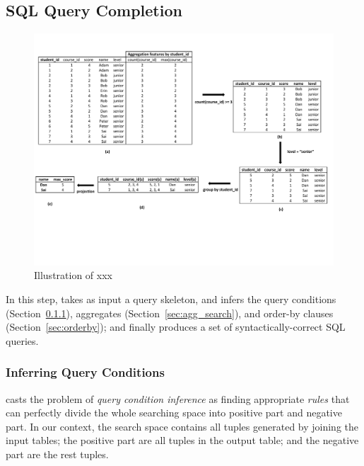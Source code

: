 \subsection{SQL Query Completion}
\label{sec:completion}


\begin{figure}[t]
  \centering
  \includegraphics[scale=0.65]{fullexample}
  \vspace*{-1.0ex}\caption {{\label{fig:fullexample}
  Illustration of xxx 
}}

\end{figure}

In this step, \ourtool takes as input a query skeleton, and
infers the query conditions (Section~\ref{sec:condition}),
aggregates (Section~\ref{sec:agg_search}), and order-by clauses (Section~\ref{sec:orderby}); and finally
produces a set of syntactically-correct SQL queries.


\subsubsection{Inferring Query Conditions}
\label{sec:condition}

\ourtool casts the problem of \textit{query condition inference} as finding
appropriate \textit{rules} that can perfectly divide the whole searching space
into positive part and negative part. In our context, the search space
contains all tuples generated by joining the input tables; the positive part
are all tuples in the output table; and the negative part are the rest
tuples.

